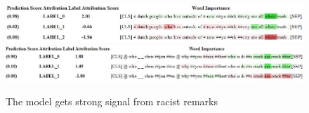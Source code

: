 \documentclass[11pt,a4paper]{article}
\begin{document}
\begin{figure}[!ht]
  \includegraphics[width=2\linewidth]{./tables-figures/white-trash-example.JPG} 
  \includegraphics[width=2\linewidth]{./tables-figures/racism-example.JPG} 
  \caption{The model gets strong signal from racist remarks}
  \label{fig:racism-example}
\end{figure}

\end{document}
